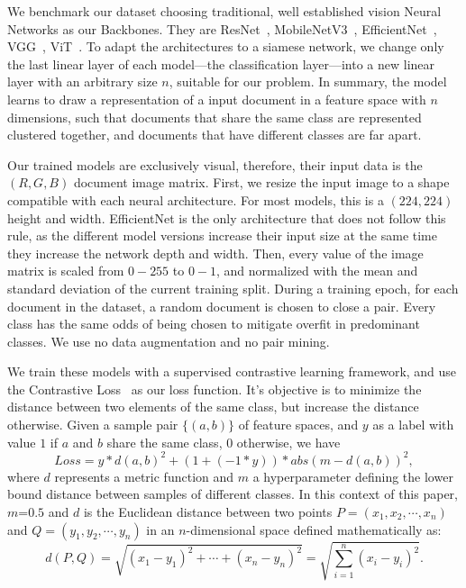 We benchmark our dataset choosing traditional, well established vision Neural Networks as our Backbones. They are ResNet~\cite{he_deep_2016}, MobileNetV3~\cite{howard_searching_2019}, EfficientNet~\cite{tan_efficientnet_2019}, VGG~\cite{simonyan_very_2015}, \gls{ViT}~\cite{dosovitskiy_image_2021}. To adapt the architectures to a siamese network, we change only the last linear layer of each model---the classification layer---into a new linear layer with an arbitrary size $n$, suitable for our problem. In summary, the model learns to draw a representation of a input document in a feature space with $n$ dimensions, such that documents that share the same class are represented clustered together, and documents that have different classes are far apart. 

Our trained models are exclusively visual, therefore, their input data is the $(R, G, B)$ document image matrix. First, we resize the input image to a shape compatible with each neural architecture. For most models, this is a $(224, 224)$ height and width. EfficientNet is the only architecture that does not follow this rule, as the different model versions increase their input size at the same time they increase the network depth and width. Then, every value of the image matrix is scaled from $0-255$ to $0-1$, and normalized with the mean and standard deviation of the current training split. During a training epoch, for each document in the dataset, a random document is chosen to close a pair. Every class has the same odds of being chosen to mitigate overfit in predominant classes. We use no data augmentation and no pair mining.

We train these models with a supervised contrastive learning framework, and use the Contrastive Loss~\cite{chopra_learning_2005} as our loss function. It's objective is to minimize the distance between two elements of the same class, but increase the distance otherwise. Given a sample pair $\{(a, b)\}$ of feature spaces, and $y$ as a label with value $1$ if $a$ and $b$ share the same class, $0$ otherwise, we have
\begin{equation}
        Loss = y * d(a, b)^2 + (1 + (-1 * y)) * abs(m - d(a, b))^2,
\end{equation}
where $d$ represents a metric function and $m$ a hyperparameter defining the lower bound distance between samples of different classes. In this context of this paper, $m$=$0.5$ and $d$ is the Euclidean distance between two points $P = (x_1, x_2, \cdots, x_n)$ and $Q = (y_1, y_2, \cdots, y_n)$ in an $n$-dimensional space defined mathematically as:
\begin{equation}
d(P,Q)={\sqrt {(x_{1}-y_{1})^{2}+ \cdots +(x_{n}-y_{n})^{2}}} = \sqrt{ \sum_{i=1}^{n} (x_i - y_i)^2 }.
\end{equation}
